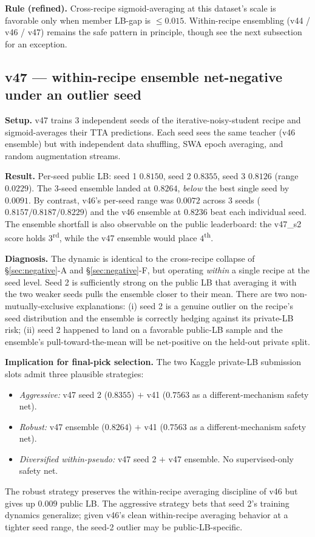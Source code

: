 \documentclass[conference]{IEEEtran}
\begin{document}
\textbf{Rule (refined).} Cross-recipe sigmoid-averaging at this dataset's scale is favorable only when member LB-gap is $\le 0.015$. Within-recipe ensembling (v44 / v46 / v47) remains the safe pattern in principle, though see the next subsection for an exception.

\subsection{v47 --- within-recipe ensemble net-negative under an outlier seed}

\textbf{Setup.} v47 trains 3 independent seeds of the iterative-noisy-student recipe and sigmoid-averages their TTA predictions. Each seed sees the same teacher (v46 ensemble) but with independent data shuffling, SWA epoch averaging, and random augmentation streams.

\textbf{Result.} Per-seed public LB: seed 1 $0.8150$, seed 2 $\mathbf{0.8355}$, seed 3 $0.8126$ (range $0.0229$). The 3-seed ensemble landed at $0.8264$, \emph{below} the best single seed by $0.0091$. By contrast, v46's per-seed range was $0.0072$ across 3 seeds ($0.8157 / 0.8187 / 0.8229$) and the v46 ensemble at $0.8236$ beat each individual seed. The ensemble shortfall is also observable on the public leaderboard: the v47\_s2 score holds $3$\textsuperscript{rd}, while the v47 ensemble would place $4$\textsuperscript{th}.

\textbf{Diagnosis.} The dynamic is identical to the cross-recipe collapse of \S\ref{sec:negative}-A and \S\ref{sec:negative}-F, but operating \emph{within} a single recipe at the seed level. Seed 2 is sufficiently strong on the public LB that averaging it with the two weaker seeds pulls the ensemble closer to their mean. There are two non-mutually-exclusive explanations: (i) seed 2 is a genuine outlier on the recipe's seed distribution and the ensemble is correctly hedging against its private-LB risk; (ii) seed 2 happened to land on a favorable public-LB sample and the ensemble's pull-toward-the-mean will be net-positive on the held-out private split.

\textbf{Implication for final-pick selection.} The two Kaggle private-LB submission slots admit three plausible strategies:
\begin{itemize}
  \item \emph{Aggressive:} v47 seed 2 ($0.8355$) $+$ v41 ($0.7563$ as a different-mechanism safety net).
  \item \emph{Robust:} v47 ensemble ($0.8264$) $+$ v41 ($0.7563$ as a different-mechanism safety net).
  \item \emph{Diversified within-pseudo:} v47 seed 2 $+$ v47 ensemble. No supervised-only safety net.
\end{itemize}
The robust strategy preserves the within-recipe averaging discipline of v46 but gives up $0.009$ public LB. The aggressive strategy bets that seed 2's training dynamics generalize; given v46's clean within-recipe averaging behavior at a tighter seed range, the seed-2 outlier may be public-LB-specific.
\end{document}
